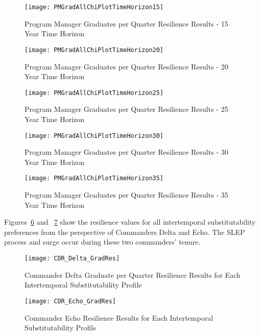 \begin{figure}[h]
  \centering\texttt{[image: PMGradAllChiPlotTimeHorizon15]}
  \caption{Program Manager Graduates per Quarter Resilience Results  - 15 Year Time Horizon}
  \label{f:PMresultsGradAllChi15}
\end{figure}


\begin{figure}[h]
  \centering\texttt{[image: PMGradAllChiPlotTimeHorizon20]}
  \caption{Program Manager Graduates per Quarter Resilience Results  - 20 Year Time Horizon}
  \label{f:PMresultsGradAllChi20}
\end{figure}

\begin{figure}[h]
  \centering\texttt{[image: PMGradAllChiPlotTimeHorizon25]}
  \caption{Program Manager Graduates per Quarter Resilience Results - 25 Year Time Horizon}
  \label{f:PMresultsGradAllChi25}
\end{figure}

\begin{figure}[h]
  \centering\texttt{[image: PMGradAllChiPlotTimeHorizon30]}
  \caption{Program Manager Graduates per Quarter Resilience Results  - 30 Year Time Horizon}
  \label{f:PMresultsGradAllChi30}
\end{figure}

\begin{figure}[h]
  \centering\texttt{[image: PMGradAllChiPlotTimeHorizon35]}
  \caption{Program Manager Graduates per Quarter Resilience Results - 35 Year Time Horizon}
  \label{f:PMresultsGradAllChi35}
\end{figure}

Figures~\ref{f:CO_D_Grad} and ~\ref{f:CO_E_Grad} show
the resilience values for all intertemporal substitutability
preferences from the perspective of Commanders Delta and 
Echo. The SLEP process and surge occur during these two commanders'
tenure.

\begin{figure}[h]
  \centering\texttt{[image: CDR\_Delta\_GradRes]}
  \caption{Commander Delta Graduate per Quarter Resilience Results for
  Each Intertemporal Substitutability Profile}
  \label{f:CO_D_Grad}
\end{figure}

\begin{figure}[h]
  \centering\texttt{[image: CDR\_Echo\_GradRes]}
  \caption{Commander Echo Resilience Results for
  Each Intertemporal Substitutability Profile}
  \label{f:CO_E_Grad}
\end{figure}

